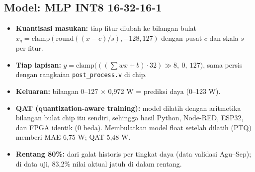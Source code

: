 \documentclass[10.5pt,a4paper]{article}
\newcommand{\cmd}[1]{\texttt{#1}}
\begin{document}
\subsection{Model: MLP INT8 16-32-16-1}
\begin{center}
\end{center}
\begin{itemize}
  \item \textbf{Kuantisasi masukan:} tiap fitur diubah ke bilangan bulat $x_q = \mathrm{clamp}(\mathrm{round}((x-c)/s), -128, 127)$ dengan pusat $c$ dan skala $s$ per fitur.
  \item \textbf{Tiap lapisan:} $y = \mathrm{clamp}\big(((\textstyle\sum w x + b)\cdot 32) \gg 8,\ 0,\ 127\big)$, sama persis dengan rangkaian \cmd{post\_process.v} di chip.
  \item \textbf{Keluaran:} bilangan 0--127 $\times$ 0,972 W = prediksi daya (0--123 W).
  \item \textbf{QAT (quantization-aware training):} model dilatih dengan aritmetika bilangan bulat chip itu sendiri, sehingga hasil Python, Node-RED,
        ESP32, dan FPGA identik (0 beda). Membulatkan model float setelah dilatih (PTQ) memberi MAE 6,75 W; QAT 5,48 W.
  \item \textbf{Rentang 80\%:} dari galat historis per tingkat daya (data validasi Agu--Sep); di data uji, 83,2\% nilai aktual jatuh di dalam rentang.
\end{itemize}
\end{document}
